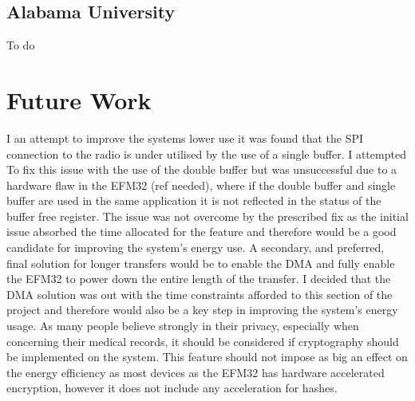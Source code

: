 \subsection{Alabama University}
To do

\section{Future Work}
I an attempt to improve the systems lower use it was found that the SPI connection to the radio is
under utilised by the use of a single buffer. I attempted To fix this issue with the use of the double
buffer but was unsuccessful due to a hardware flaw in the EFM32 (ref needed), where if the double
buffer and single buffer are used in the same application it is not reflected in the status of the buffer
free register. The issue was not overcome by the prescribed fix as the initial issue absorbed the time
allocated for the feature and therefore would be a good candidate for improving the system’s
energy use. A secondary, and preferred, final solution for longer transfers would be to enable the
DMA and fully enable the EFM32 to power down the entire length of the transfer. I decided that the
DMA solution was out with the time constraints afforded to this section of the project and therefore
would also be a key step in improving the system’s energy usage.
As many people believe strongly in their privacy, especially when concerning their medical records, it
should be considered if cryptography should be implemented on the system. This feature should not
impose as big an effect on the energy efficiency as most devices as the EFM32 has hardware
accelerated encryption, however it does not include any acceleration for hashes.

